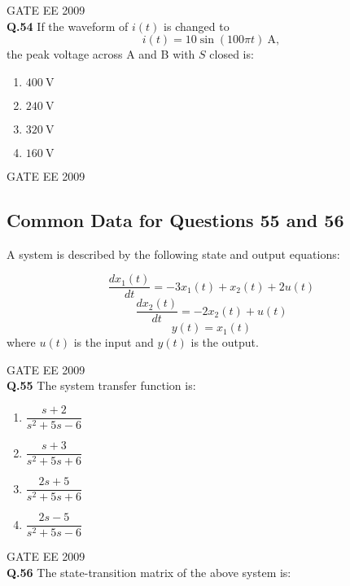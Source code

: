 \documentclass[12pt]{article}
\begin{document}
\hspace{10pt}
GATE EE 2009\\

\textbf{Q.54} If the waveform of \( i(t) \) is changed to  
\[
i(t) = 10 \sin(100 \pi t) \ \text{A},
\]  
the peak voltage across A and B with \( S \) closed is:

\begin{enumerate}
    

\item \(400 \ \mathrm{V}\) 
\item \(240 \ \mathrm{V}\) 
\item \(320 \ \mathrm{V}\) 
\item  \(160 \ \mathrm{V}\)
\end{enumerate}

\vspace{1cm}
\hspace{10pt}
GATE EE 2009\\
\subsection*{Common Data for Questions 55 and 56}

A system is described by the following state and output equations:

\[
\frac{dx_1(t)}{dt} = -3x_1(t) + x_2(t) + 2u(t)
\]
\[
\frac{dx_2(t)}{dt} = -2x_2(t) + u(t)
\]
\[
y(t) = x_1(t)
\]
where \(u(t)\) is the input and \(y(t)\) is the output.

\vspace{0.5cm}
\hspace{10pt}
GATE EE 2009\\
\textbf{Q.55} The system transfer function is:

\begin{enumerate}
    
\item  \(\dfrac{s+2}{s^{2} + 5s - 6}\) 
\item  \(\dfrac{s+3}{s^{2} + 5s + 6}\) 
\item  \(\dfrac{2s+5}{s^{2} + 5s + 6}\)
\item  \(\dfrac{2s - 5}{s^{2} + 5s - 6}\)
\end{enumerate}

\vspace{0.5cm}
\hspace{10pt}
GATE EE 2009\\
\textbf{Q.56} The state-transition matrix of the above system is:
\end{document}
